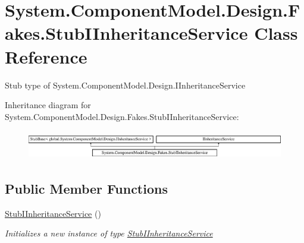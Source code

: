 \hypertarget{class_system_1_1_component_model_1_1_design_1_1_fakes_1_1_stub_i_inheritance_service}{\section{System.\-Component\-Model.\-Design.\-Fakes.\-Stub\-I\-Inheritance\-Service Class Reference}
\label{class_system_1_1_component_model_1_1_design_1_1_fakes_1_1_stub_i_inheritance_service}
}


Stub type of System.\-Component\-Model.\-Design.\-I\-Inheritance\-Service 


Inheritance diagram for System.\-Component\-Model.\-Design.\-Fakes.\-Stub\-I\-Inheritance\-Service\-:\begin{figure}[H]
\begin{center}
\leavevmode
\includegraphics[height=1.290323cm]{class_system_1_1_component_model_1_1_design_1_1_fakes_1_1_stub_i_inheritance_service}
\end{center}
\end{figure}
\subsection*{Public Member Functions}
\begin{DoxyCompactItemize}
\item 
\hyperlink{class_system_1_1_component_model_1_1_design_1_1_fakes_1_1_stub_i_inheritance_service_a8c9ef2e6fb321ba7c235ed1cc3dab36e}{Stub\-I\-Inheritance\-Service} ()
\begin{DoxyCompactList}\small\item\em Initializes a new instance of type \hyperlink{class_system_1_1_component_model_1_1_design_1_1_fakes_1_1_stub_i_inheritance_service}{Stub\-I\-Inheritance\-Service}\end{DoxyCompactList}\end{DoxyCompactItemize}

